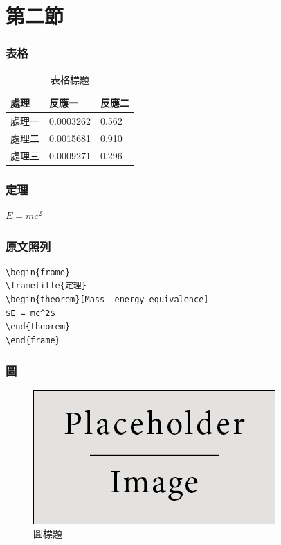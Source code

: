 \documentclass[hyperref={bookmarks=false}]{beamer}
\begin{document}
\section{第二節}

\begin{frame}
\frametitle{\iyan 表格}
\begin{table}
\begin{tabular}{l l l}
\toprule
\textbf{處理} & \textbf{反應一} & \textbf{反應二}\\
\midrule
處理一 & 0.0003262 & 0.562 \\
處理二 & 0.0015681 & 0.910 \\
處理三 & 0.0009271 & 0.296 \\
\bottomrule
\end{tabular}
\caption{表格標題}
\end{table}
\end{frame}


\begin{frame}
\frametitle{\iyan 定理}
\begin{theorem}
$E = mc^2$
\end{theorem}
\end{frame}


\begin{frame}[fragile] %
\frametitle{\iyan 原文照列}
\begin{example}
\begin{verbatim}
\begin{frame}
\frametitle{定理}
\begin{theorem}[Mass--energy equivalence]
$E = mc^2$
\end{theorem}
\end{frame}\end{verbatim}
\end{example}
\end{frame}


\begin{frame}
\frametitle{\iyan 圖}
\begin{figure}
 \includegraphics[width=0.6\linewidth, scale=.8]{placeholder.jpg}
 \caption{圖標題}
\end{figure}
\end{frame}
\end{document}
